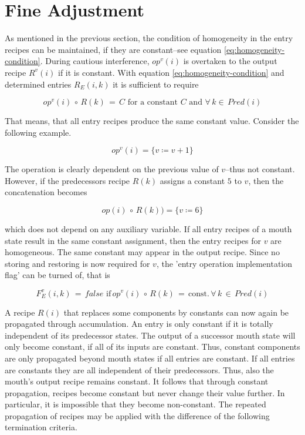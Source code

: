 \documentclass[12pt,a4paper]{scrartcl}
\begin{document}
%
\section{Fine Adjustment}

As mentioned in the previous section, the condition of homogeneity in the entry
recipes can be maintained, if they are constant--see equation
\ref{eq:homogeneity-condition}.  During cautious interference, $op^v(i)$ is
overtaken to the output recipe $R^v(i)$ if it is constant.  With equation
\ref{eq:homogeneity-condition} and determined entries $R_E(i,k)$ it is
sufficient to require 

\begin{equation} \label{eq:homogeneity-condition-2}
    op^v(i)\,\circ\,R(k)\,=\,C\,\,\mbox{for a constant $C$ and } \forall\,k\in\,Pred(i)
\end{equation}

That means, that all entry recipes produce the same constant value. Consider
the following example.

\begin{equation}
    op^v(i) = \{ v \coloneqq  v + 1 \}
\end{equation}

The operation is clearly dependent on the previous value of $v$--thus not
constant. However, if the predecessors recipe $R(k)$ assigns a constant $5$ to
$v$, then the concatenation becomes

\begin{equation}
    op(i)\,\circ\,R(k)) = \{ v \coloneqq  6 \}
\end{equation}

which does not depend on any auxiliary variable. If all entry recipes of a
mouth state result in the same constant assignment, then the entry recipes for
$v$ are homogeneous.  The same constant may appear in the output recipe. Since
no storing and restoring is now required for $v$, the 'entry operation
implementation flag' can be turned of, that is

\begin{equation}
    F_E^v(i,k)\,=\,false\,\,\mbox{if}\,op^v(i)\,\circ\,R(k)\,=\,\mbox{const.}\,\forall\,k\,\in\,Pred(i)
\end{equation}

A recipe $R(i)$ that replaces some components by constants can now again be
propagated through accumulation. An entry is only constant if it is totally
independent of its predecessor states. The output of a successor mouth state
will only become constant, if all of its inputs are constant. Thus, constant
components are only propagated beyond mouth states if all entries are constant.
If all entries are constants they are all independent of their predecessors.
Thus, also the mouth's output recipe remains constant. It follows that through
constant propagation, recipes become constant but never change their value
further.  In particular, it is impossible that they become non-constant.
The repeated propagation of recipes may be applied with the difference of the
following termination criteria.
\end{document}
